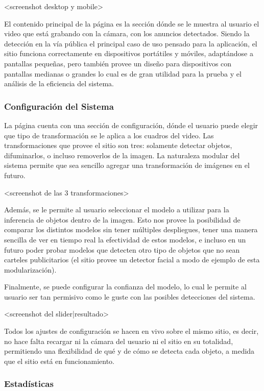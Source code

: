 \documentclass[a4paper]{article}
\begin{document}
<screenshot desktop y mobile>

El contenido principal de la página es la sección dónde se le muestra al usuario el video que está grabando con la cámara, con los anuncios detectados. Siendo la detección en la vía pública el principal caso de uso pensado para la aplicación, el sitio funciona correctamente en dispositivos portátiles y móviles, adaptándose a pantallas pequeñas, pero también provee un diseño para dispositivos con pantallas medianas o grandes lo cual es de gran utilidad para la prueba y el análisis de la eficiencia del sistema.

\subsubsection{Configuración del Sistema}

La página cuenta con una sección de configuración, dónde el usuario puede elegir que tipo de transformación se le aplica a los cuadros del video. Las transformaciones que provee el sitio son tres: solamente detectar objetos, difuminarlos, o incluso removerlos de la imagen. La naturaleza modular del sistema permite que sea sencillo agregar una transformación de imágenes en el futuro.

<screenshot de las 3 transformaciones>

Además, se le permite al usuario seleccionar el modelo a utilizar para la inferencia de objetos dentro de la imagen. Esto nos provee la posibilidad de comparar los distintos modelos sin tener múltiples despliegues, tener una manera sencilla de ver en tiempo real la efectividad de estos modelos, e incluso en un futuro poder probar modelos que detecten otro tipo de objetos que no sean carteles publicitarios (el sitio provee un detector facial a modo de ejemplo de esta modularización).

Finalmente, se puede configurar la confianza del modelo, lo cual le permite al usuario ser tan permisivo como le guste con las posibles detecciones del sistema.

<screenshot del slider|resultado>

Todos los ajustes de configuración se hacen en vivo sobre el mismo sitio, es decir, no hace falta recargar ni la cámara del usuario ni el sitio en su totalidad, permitiendo una flexibilidad de qué y de cómo se detecta cada objeto, a medida que el sitio está en funcionamiento.

\subsubsection{Estadísticas}
\end{document}
